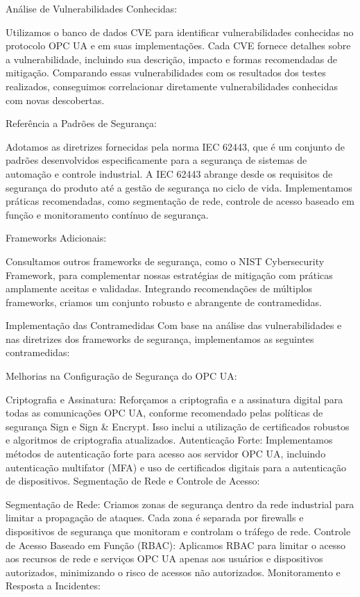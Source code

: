     {\color{red}

    Análise de Vulnerabilidades Conhecidas:

    Utilizamos o banco de dados CVE para identificar vulnerabilidades conhecidas no protocolo OPC UA e em suas implementações. Cada CVE fornece detalhes sobre a vulnerabilidade, incluindo sua descrição, impacto e formas recomendadas de mitigação. Comparando essas vulnerabilidades com os resultados dos testes realizados, conseguimos correlacionar diretamente vulnerabilidades conhecidas com novas descobertas.

    Referência a Padrões de Segurança:

    Adotamos as diretrizes fornecidas pela norma IEC 62443, que é um conjunto de padrões desenvolvidos especificamente para a segurança de sistemas de automação e controle industrial. A IEC 62443 abrange desde os requisitos de segurança do produto até a gestão de segurança no ciclo de vida. Implementamos práticas recomendadas, como segmentação de rede, controle de acesso baseado em função e monitoramento contínuo de segurança.

    Frameworks Adicionais:

    Consultamos outros frameworks de segurança, como o NIST Cybersecurity Framework, para complementar nossas estratégias de mitigação com práticas amplamente aceitas e validadas. Integrando recomendações de múltiplos frameworks, criamos um conjunto robusto e abrangente de contramedidas.

    Implementação das Contramedidas
    Com base na análise das vulnerabilidades e nas diretrizes dos frameworks de segurança, implementamos as seguintes contramedidas:

    Melhorias na Configuração de Segurança do OPC UA:

    Criptografia e Assinatura: Reforçamos a criptografia e a assinatura digital para todas as comunicações OPC UA, conforme recomendado pelas políticas de segurança Sign e Sign \& Encrypt. Isso inclui a utilização de certificados robustos e algoritmos de criptografia atualizados.
    Autenticação Forte: Implementamos métodos de autenticação forte para acesso aos servidor OPC UA, incluindo autenticação multifator (MFA) e uso de certificados digitais para a autenticação de dispositivos.
    Segmentação de Rede e Controle de Acesso:

    Segmentação de Rede: Criamos zonas de segurança dentro da rede industrial para limitar a propagação de ataques. Cada zona é separada por firewalls e dispositivos de segurança que monitoram e controlam o tráfego de rede.
    Controle de Acesso Baseado em Função (RBAC): Aplicamos RBAC para limitar o acesso aos recursos de rede e serviços OPC UA apenas aos usuários e dispositivos autorizados, minimizando o risco de acessos não autorizados.
    Monitoramento e Resposta a Incidentes:

}
